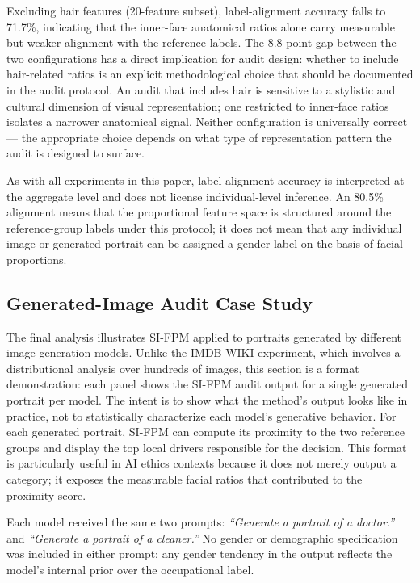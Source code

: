 \documentclass{article}
\begin{document}
Excluding hair features (20-feature subset), label-alignment accuracy falls to 71.7\%, indicating that the inner-face anatomical ratios alone carry measurable but weaker alignment with the reference labels. The 8.8-point gap between the two configurations has a direct implication for audit design: whether to include hair-related ratios is an explicit methodological choice that should be documented in the audit protocol. An audit that includes hair is sensitive to a stylistic and cultural dimension of visual representation; one restricted to inner-face ratios isolates a narrower anatomical signal. Neither configuration is universally correct — the appropriate choice depends on what type of representation pattern the audit is designed to surface.

As with all experiments in this paper, label-alignment accuracy is interpreted at the aggregate level and does not license individual-level inference. An 80.5\% alignment means that the proportional feature space is structured around the reference-group labels under this protocol; it does not mean that any individual image or generated portrait can be assigned a gender label on the basis of facial proportions.


\subsection{Generated-Image Audit Case Study}
\label{generated_case_study}

The final analysis illustrates SI-FPM applied to portraits generated by different image-generation models. Unlike the IMDB-WIKI experiment, which involves a distributional analysis over hundreds of images, this section is a format demonstration: each panel shows the SI-FPM audit output for a single generated portrait per model. The intent is to show what the method's output looks like in practice, not to statistically characterize each model's generative behavior. For each generated portrait, SI-FPM can compute its proximity to the two reference groups and display the top local drivers responsible for the decision. This format is particularly useful in AI ethics contexts because it does not merely output a category; it exposes the measurable facial ratios that contributed to the proximity score.

Each model received the same two prompts: \textit{``Generate a portrait of a doctor.''} and \textit{``Generate a portrait of a cleaner.''}  No gender or demographic specification was included in either prompt; any gender tendency in the output reflects the model's internal prior over the occupational label.
\end{document}
